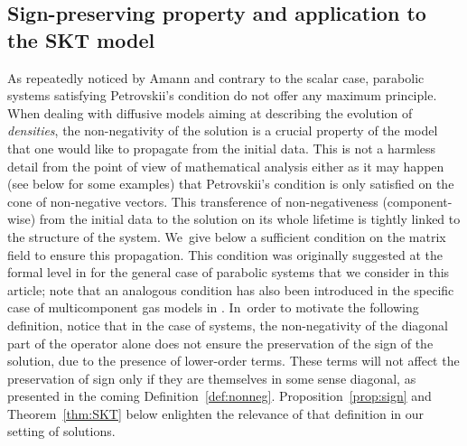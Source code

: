 \documentclass[JEP,XML,SOM,Unicode,published]{cedram}
\theoremstyle{definition}
\begin{document}
\subsection{Sign-preserving property and application to the SKT model}

As repeatedly noticed by Amann \cite{amann} and contrary to the scalar case, parabolic systems satisfying Petrovskii's condition do not offer any maximum principle. When dealing with diffusive models aiming at describing the evolution of \emph{densities}, the non-negativity of the solution is a crucial property of the model that one would like to propagate from the initial data. This is not a harmless detail from the point of view of mathematical analysis either as it may happen (see below for some examples) that Petrovskii's condition is only satisfied on the cone of non-negative vectors. This transference of non-negativeness (component-wise) from the initial data to the solution on its whole lifetime is tightly linked to the structure of the system. We~give below a sufficient condition on the matrix field to ensure this propagation. This condition was originally suggested at the formal level in \cite{pilou} for the general case of parabolic systems that we consider in this article; note that an analogous condition has also been introduced in the specific case of multicomponent gas models in \cite[\S 7.3.3]{gio}. In~order to motivate the following definition, notice that in the case of systems, the non-negativity of the diagonal part of the operator alone does not ensure the preservation of the sign of the solution, due to the presence of lower-order terms. These terms will not affect the preservation of sign only if they are themselves in some sense diagonal, as presented in the coming Definition~\ref{def:nonneg}. Proposition~\ref{prop:sign} and Theorem~\ref{thm:SKT} below enlighten the relevance of that definition in our setting of solutions.
\end{document}
